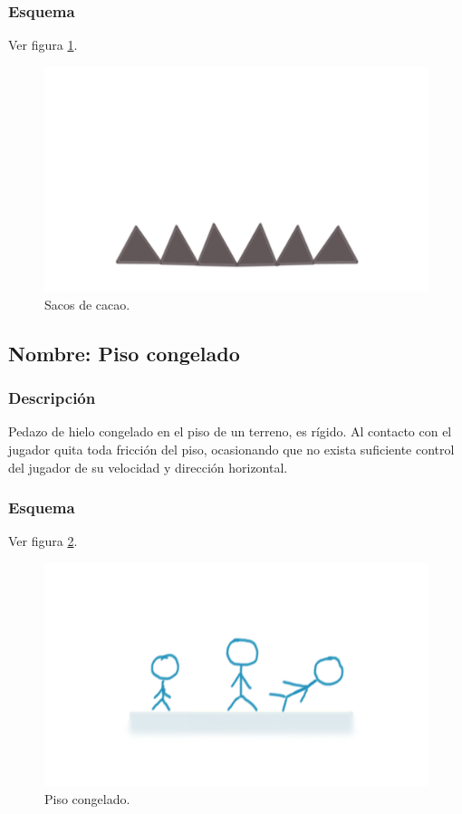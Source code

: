 \documentclass[11pt,letterpaper]{article}
\begin{document}
	\subsubsection{Esquema}
	Ver figura \ref{fig:piedrasF}.
	\begin{figure}
		\centering
		\includegraphics[height=0.2 \textheight]{Imagenes/piedrasF}
		\caption{Sacos de cacao.}
		\label{fig:piedrasF}
	\end{figure}
		\subsection{Nombre: Piso congelado}\label{obs.pisoC}
	\subsubsection{Descripción}
	Pedazo de hielo congelado en el piso de un terreno, es rígido. Al contacto con el jugador quita toda fricción del piso, ocasionando que no exista suficiente control del jugador de su velocidad y dirección horizontal.
	\subsubsection{Esquema}
	Ver figura \ref{fig:pisoC}.
	\begin{figure}
		\centering
		\includegraphics[height=0.2 \textheight]{Imagenes/pisoC}
		\caption{Piso congelado.}
		\label{fig:pisoC}
	\end{figure}
\end{document}

